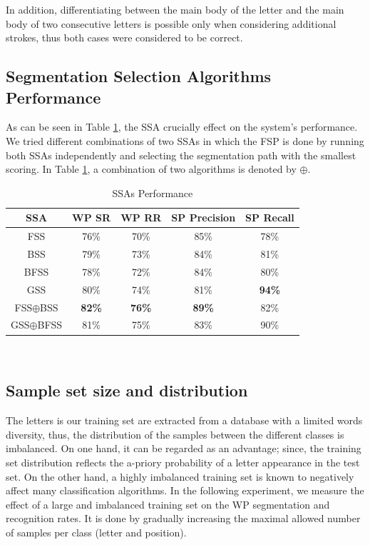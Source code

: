 \documentclass[10pt, conference, compsocconf]{IEEEtran}
\begin{document}
In addition, differentiating between the main body of the letter  and the main body of two consecutive  letters is possible only when considering additional strokes, thus both cases were considered to be correct.

\subsection{Segmentation Selection Algorithms Performance}
\label{subsec:ssa_performance}
As can be seen in Table \ref{table:ss_algorithms_results}, the SSA crucially effect on the system's performance. 
We tried different combinations of two SSAs in which the FSP is done by running both SSAs independently and selecting the segmentation path with the smallest scoring. 
In Table \ref{table:ss_algorithms_results}, a combination of two algorithms is denoted by $\oplus$.

\begin{table}[h]
\caption{SSAs Performance}
\renewcommand{\arraystretch}{1.2}
\begin{tabular}{ | c | c | c | c | c |}
\hline
SSA & WP SR & WP RR & SP Precision & SP Recall\\
\hline                 
  FSS & 76\% & 70\% & 85\% & 78\% \\ 
  \hline
  BSS & 79\% &  73\% & 84\%& 81\% \\
  \hline
  BFSS & 78\% & 72\% & 84\% & 80\%\\ 
  \hline
  GSS & 80\% & 74\% & 81\% & \bf{94}\% \\  
  \hline
  FSS$\oplus$BSS & \bf{82}\% & \bf{76}\% & \bf{89}\% & 82\%\\  
  \hline
  GSS$\oplus$BFSS & 81\% & 75\% & 83\% & 90\% \\
  \hline
\end{tabular}
\\
\centering
\label{table:ss_algorithms_results} 
\end{table}

\subsection{Sample set size and distribution}
The letters is our training set are extracted from a database with a limited words diversity, thus, the distribution of the samples between the different classes is imbalanced. 
On one hand, it can be regarded as an advantage; since, the training set distribution reflects the a-priory probability of a letter appearance in the test set. 
On the other hand, a highly imbalanced training set is known to negatively affect many classification algorithms.
In the following experiment, we measure the effect of a large and imbalanced training set on the WP segmentation and recognition rates. 
It is done by gradually increasing the maximal allowed number of samples per class (letter and position).
 
\end{document}
